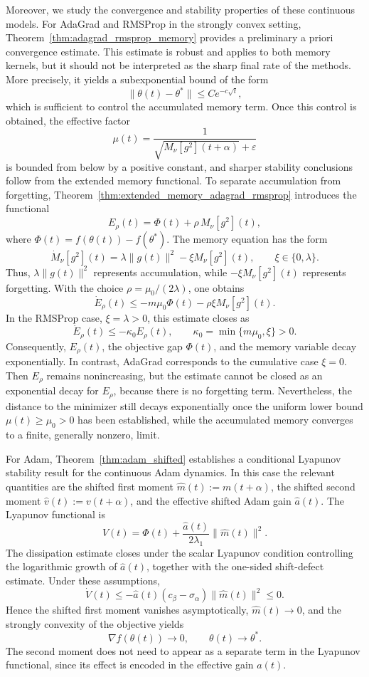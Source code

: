 \documentclass{article} %
\begin{document}
Moreover, we study the convergence and stability properties of these continuous models. For AdaGrad and RMSProp in the strongly convex setting, Theorem~\ref{thm:adagrad_rmsprop_memory} provides a preliminary a priori convergence estimate. This estimate is robust and applies to both memory kernels, but it should not be interpreted as the sharp final rate of the methods. More precisely, it yields a subexponential bound of the form
\[
    \|\theta(t)-\theta^\ast\|\leq C e^{-c\sqrt t},
\]
which is sufficient to control the accumulated memory term. Once this control is obtained, the effective factor
\[
    \mu(t)
    =
    \frac{1}{\sqrt{M_\nu[g^2](t+\alpha)}+\varepsilon}
\]
is bounded from below by a positive constant, and sharper stability conclusions follow from the extended memory functional. To separate accumulation from forgetting, Theorem~\ref{thm:extended_memory_adagrad_rmsprop} introduces the functional
\[
    E_\rho(t)=\Phi(t)+\rho\,M_\nu[g^2](t),
\]
where $\Phi(t)=f(\theta(t))-f(\theta^\ast)$. The memory equation has the form
\[
    \dot M_\nu[g^2](t)
    =
    \lambda\|g(t)\|^2-\xi M_\nu[g^2](t),
    \qquad
    \xi\in\{0,\lambda\}.
\]
Thus, $\lambda\|g(t)\|^2$ represents accumulation, while $-\xi M_\nu[g^2](t)$ represents forgetting. With the choice $\rho=\mu_0/(2\lambda)$, one obtains
\[
    \dot E_\rho(t)
    \leq
    -m\mu_0\Phi(t)-\rho\xi M_\nu[g^2](t).
\]
In the RMSProp case, $\xi=\lambda>0$, this estimate closes as
\[
    \dot E_\rho(t)\leq -\kappa_0E_\rho(t),
    \qquad
    \kappa_0=\min\{m\mu_0,\xi\}>0.
\]
Consequently, $E_\rho(t)$, the objective gap $\Phi(t)$, and the memory variable decay exponentially. In contrast, AdaGrad corresponds to the cumulative case $\xi=0$. Then $E_\rho$ remains nonincreasing, but the estimate cannot be closed as an exponential decay for $E_\rho$, because there is no forgetting term. Nevertheless, the distance to the minimizer still decays exponentially once the uniform lower bound $\mu(t)\geq \mu_0>0$ has been established, while the accumulated memory converges to a finite, generally nonzero, limit.

For Adam, Theorem~\ref{thm:adam_shifted} establishes a conditional Lyapunov stability result for the continuous Adam dynamics. In this case the relevant quantities are the shifted first moment $\widehat m(t):=m(t+\alpha)$, the shifted second moment $\widehat v(t):=v(t+\alpha)$,
and the effective shifted Adam gain $\widehat a(t)$. The Lyapunov functional is
\[
    V(t)
    =
    \Phi(t)
    +
    \frac{\widehat a(t)}{2\lambda_1}
    \|\widehat m(t)\|^2.
\]
The dissipation estimate closes under the scalar Lyapunov condition controlling the logarithmic growth of $\widehat a(t)$, together with the one-sided shift-defect estimate. Under these assumptions,
\[
    \dot V(t)
    \leq
    -\widehat a(t)(c_\beta-\sigma_\alpha)\|\widehat m(t)\|^2
    \leq 0.
\]
Hence the shifted first moment vanishes asymptotically, $\widehat m(t)\to0$, and the strongly convexity of the objective yields
\[
    \nabla f(\theta(t))\to0,
    \qquad
    \theta(t)\to\theta^\ast .
\]
The second moment does not need to appear as a separate term in the Lyapunov functional, since its effect is encoded in the effective gain $\widehat a(t)$.
\end{document}
